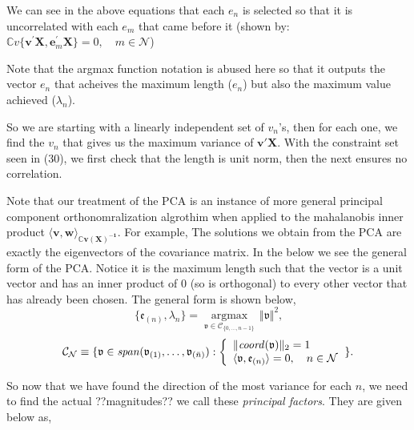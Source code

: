 \documentclass{article}
\theoremstyle{definition}
\theoremstyle{remark}
\begin{document}
\par We can see in the above equations that 
each $e_n$ is selected so that it is uncorrelated with each $e_m$ 
that came before it (shown by: $\mathbb{C}v\{\boldsymbol{v}^{\prime}\boldsymbol{X},\boldsymbol{e}_{m}^{\prime}\boldsymbol{X}\}=0, \quad m\in\mathcal{N}$)
\par Note that the argmax function notation is abused here so that 
it outputs the vector $e_n$ that acheives the maximum length ($e_n$)
but also the maximum value achieved ($\lambda_n$).
\par So we are starting with a linearly independent set of $v_n$'s, then for each one, we find the $v_n$ that gives us the maximum 
variance of $\mathbf{v'}\mathbf{X}$. With the constraint set seen in (30), we first check 
that the length is unit norm, then the next ensures no correlation. 
\par Note that our treatment of the PCA is an instance of more general
principal component orthonomralization algrothim when applied to the mahalanobis inner product $\langle\boldsymbol{v}, \boldsymbol{w}\rangle_{\boldsymbol{\mathbb{C}v(\boldsymbol{X})^{-1}}}$. For 
example, The solutions we obtain from the PCA are exactly the eigenvectors of the covariance matrix. In the below we see the general form of the PCA. 
Notice it is the maximum length such that the vector is a unit vector 
and has an inner product of 0 (so is orthogonal) to every other vector that has already been chosen.
The general form is shown below,  
\begin{equation}
    \{\mathfrak{e}_{(n)},\lambda_{n}\}=\operatorname*{argmax}\limits_{\mathfrak{v}\in\mathcal{C}_{\{0,\ldots,n-1\}}}\,\Vert\mathfrak{v}\Vert^{2}\text{,}
    \end{equation}
    \begin{equation}
        \mathcal{C}_{\mathcal{N}}\equiv\{\mathfrak{v}\in\mathit{span}(\mathfrak{v}_{(1)},\ldots,\mathfrak{v}_{(\bar{n})}):\left\{ \begin{array}
        [c]{l}\Vert\mathit{coord}(\mathfrak{v})\Vert_{2}=1\\
        \langle\mathfrak{v},\mathfrak{e}_{(n)}\rangle=0,\quad n\in\mathcal{N}
        \end{array} \right. \}\text{.}
    \end{equation}

So now that we have found the direction of the most variance for each $n$, we need to find 
the actual ??magnitudes?? we call these \textit{principal factors}. They are
given below as,
\end{document}
